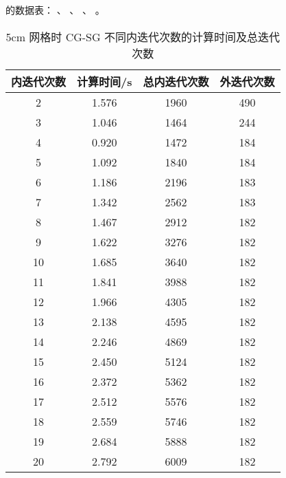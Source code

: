 \begin{datasheet}
的数据表：
、
、
、
。

\begin{table}
\centering
\caption{5cm 网格时 CG-SG 不同内迭代次数的计算时间及总迭代次数}
\label{tab:equsolve.iter.cg-sg.5cm}
\begin{tabular}{cccc}
\toprule
内迭代次数 & 计算时间/s & 总内迭代次数 & 外迭代次数\\
\midrule
2 & 1.576 & 1960 & 490\\
3 & 1.046 & 1464 & 244\\
4 & 0.920 & 1472 & 184\\
5 & 1.092 & 1840 & 184\\
6 & 1.186 & 2196 & 183\\
7 & 1.342 & 2562 & 183\\
8 & 1.467 & 2912 & 182\\
9 & 1.622 & 3276 & 182\\
10 & 1.685 & 3640 & 182\\
11 & 1.841 & 3988 & 182\\
12 & 1.966 & 4305 & 182\\
13 & 2.138 & 4595 & 182\\
14 & 2.246 & 4869 & 182\\
15 & 2.450 & 5124 & 182\\
16 & 2.372 & 5362 & 182\\
17 & 2.512 & 5576 & 182\\
18 & 2.559 & 5746 & 182\\
19 & 2.684 & 5888 & 182\\
20 & 2.792 & 6009 & 182\\
\bottomrule
\end{tabular}
\end{table}


\end{datasheet}

